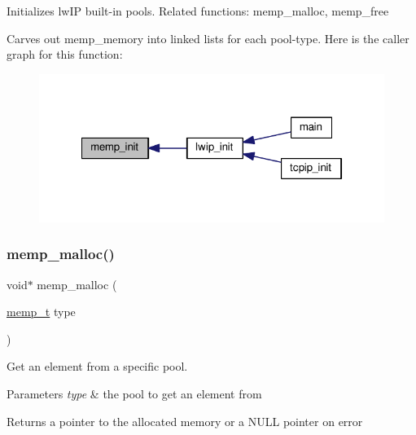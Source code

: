Initializes lw\+IP built-\/in pools. Related functions\+: memp\+\_\+malloc, memp\+\_\+free

Carves out memp\+\_\+memory into linked lists for each pool-\/type. Here is the caller graph for this function\+:
\nopagebreak
\begin{figure}[H]
\begin{center}
\leavevmode
\includegraphics[width=322pt]{openmote-cc2538_2lwip_2src_2include_2lwip_2memp_8h_a9693e5b1ac2c6b9c0e7870522d45efa2_icgraph}
\end{center}
\end{figure}
\mbox{\label{openmote-cc2538_2lwip_2src_2include_2lwip_2memp_8h_a2b00593d086313c267b54a976bf67aa5}} 
\subsubsection{\texorpdfstring{memp\+\_\+malloc()}{memp\_malloc()}}
{\footnotesize\ttfamily void$\ast$ memp\+\_\+malloc (\begin{DoxyParamCaption}\item[{\hyperlink{native_2lwip_2src_2include_2lwip_2memp_8h_a85a164b1f7764951cc685ea525114e57}{memp\+\_\+t}}]{type }\end{DoxyParamCaption})}

Get an element from a specific pool.


\begin{DoxyParams}{Parameters}
{\em type} & the pool to get an element from\\
\hline
\end{DoxyParams}
\begin{DoxyReturn}{Returns}
a pointer to the allocated memory or a N\+U\+LL pointer on error 
\end{DoxyReturn}


